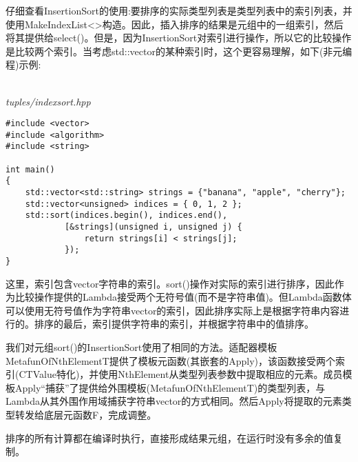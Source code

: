 仔细查看InsertionSort的使用:要排序的实际类型列表是类型列表中的索引列表，并使用MakeIndexList<>构造。因此，插入排序的结果是元组中的一组索引，然后将其提供给select()。但是，因为InsertionSort对索引进行操作，所以它的比较操作是比较两个索引。当考虑std::vector的某种索引时，这个更容易理解，如下(非元编程)示例:

\hspace*{\fill} \\ %
\noindent
\textit{tuples/indexsort.hpp}
\begin{lstlisting}[style=styleCXX]
#include <vector>
#include <algorithm>
#include <string>

int main()
{
	std::vector<std::string> strings = {"banana", "apple", "cherry"};
	std::vector<unsigned> indices = { 0, 1, 2 };
	std::sort(indices.begin(), indices.end(),
			[&strings](unsigned i, unsigned j) {
				return strings[i] < strings[j];
			});
}
\end{lstlisting}

这里，索引包含vector字符串的索引。sort()操作对实际的索引进行排序，因此作为比较操作提供的Lambda接受两个无符号值(而不是字符串值)。但Lambda函数体可以使用无符号值作为字符串vector的索引，因此排序实际上是根据字符串内容进行的。排序的最后，索引提供字符串的索引，并根据字符串中的值排序。

我们对元组sort()的InsertionSort使用了相同的方法。适配器模板MetafunOfNthElementT提供了模板元函数(其嵌套的Apply)，该函数接受两个索引(CTValue特化)，并使用NthElement从类型列表参数中提取相应的元素。成员模板Apply“捕获”了提供给外围模板(MetafunOfNthElementT)的类型列表，与Lambda从其外围作用域捕获字符串vector的方式相同。然后Apply将提取的元素类型转发给底层元函数F，完成调整。

排序的所有计算都在编译时执行，直接形成结果元组，在运行时没有多余的值复制。

















